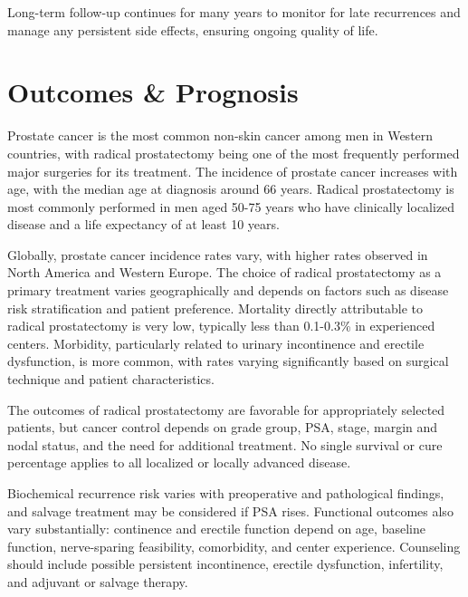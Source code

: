 Long-term follow-up continues for many years to monitor for late recurrences and manage any persistent side effects, ensuring ongoing quality of life.

\section*{Outcomes \& Prognosis}
Prostate cancer is the most common non-skin cancer among men in Western countries, with radical prostatectomy being one of the most frequently performed major surgeries for its treatment. The incidence of prostate cancer increases with age, with the median age at diagnosis around 66 years. Radical prostatectomy is most commonly performed in men aged 50-75 years who have clinically localized disease and a life expectancy of at least 10 years. 

Globally, prostate cancer incidence rates vary, with higher rates observed in North America and Western Europe. The choice of radical prostatectomy as a primary treatment varies geographically and depends on factors such as disease risk stratification and patient preference. Mortality directly attributable to radical prostatectomy is very low, typically less than 0.1-0.3\% in experienced centers. Morbidity, particularly related to urinary incontinence and erectile dysfunction, is more common, with rates varying significantly based on surgical technique and patient characteristics.

The outcomes of radical prostatectomy are favorable for appropriately selected patients, but cancer control depends on grade group, PSA, stage, margin and nodal status, and the need for additional treatment. No single survival or cure percentage applies to all localized or locally advanced disease.

Biochemical recurrence risk varies with preoperative and pathological findings, and salvage treatment may be considered if PSA rises. Functional outcomes also vary substantially: continence and erectile function depend on age, baseline function, nerve-sparing feasibility, comorbidity, and center experience. Counseling should include possible persistent incontinence, erectile dysfunction, infertility, and adjuvant or salvage therapy.

